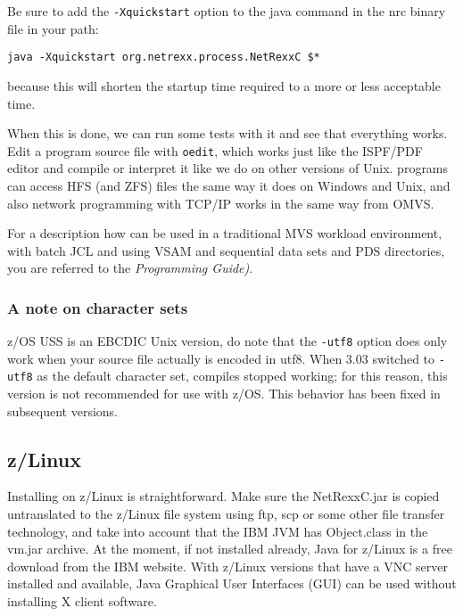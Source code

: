 Be sure to add the \texttt{-Xquickstart} option to the java command in
the nrc binary file in your path:
\begin{verbatim}
java -Xquickstart org.netrexx.process.NetRexxC $*
\end{verbatim}
because this will shorten the startup time required to a more or less
acceptable time.

When this is done, we can run some tests with it and see that
everything works. Edit a program source file with \texttt{oedit},
which works just like the ISPF/PDF editor and compile or interpret it
like we do on other versions of Unix. \nr{} programs can access HFS (and
ZFS) files the same way it does on Windows and Unix, and also network
programming with TCP/IP works in the same way from OMVS.

For a description how \nr can be used in a traditional MVS
workload environment, with batch JCL and using VSAM and sequential
data sets and PDS directories, you are referred to the \emph{\nr{}
  Programming Guide)}.
\subsubsection{A note on character sets}
z/OS USS is an EBCDIC Unix version, do note that the \texttt{-utf8}
option does only work when your source file actually is encoded in
utf8. When \nr{} 3.03 switched to \texttt{-utf8} as the default character
set, \nr{} compiles stopped working; for this reason, this version is
not recommended for use with z/OS. This behavior has been fixed in
subsequent versions.
\subsection{z/Linux}
Installing on z/Linux is straightforward. Make sure the NetRexxC.jar
is copied untranslated to the z/Linux file system using ftp, scp or
some other file transfer technology, and take into
account that the IBM JVM has Object.class in the vm.jar archive. At
the moment, if not installed already, Java for z/Linux is a free download from the IBM website. With
z/Linux versions that have a VNC server installed and available, Java
Graphical User Interfaces (GUI) can be used without installing X client software. 